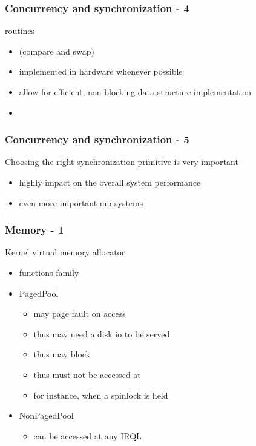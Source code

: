 
\begin{frame}
 \frametitle{Concurrency and synchronization - 4}

  routines

 \begin{itemize}
  \item {} (compare and swap)
  \item implemented in hardware whenever possible
  \item allow for efficient, non blocking data structure implementation
  \item {}
 \end{itemize}

\end{frame}


\begin{frame}
 \frametitle{Concurrency and synchronization - 5}

 Choosing the right synchronization primitive is very important

 \begin{itemize}
  \item highly impact on the overall system performance
  \item even more important mp systems
 \end{itemize}

\end{frame}


\begin{frame}
 \frametitle{Memory - 1}

 Kernel virtual memory allocator

 \begin{itemize}
  \item {} functions family

  \item PagedPool
  \begin{itemize}
   \item may page fault on access
   \item thus may need a disk io to be served
   \item thus may block
   \item thus must not be accessed at 
   \item for instance, when a spinlock is held
  \end{itemize}

  \item NonPagedPool
  \begin{itemize}
   \item can be accessed at any IRQL
  \end{itemize}

 \end{itemize}

\end{frame}

